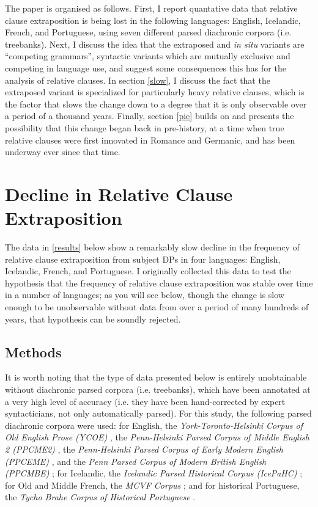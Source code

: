 The paper is organised as follows.
First, I report quantative data that relative clause extraposition is being lost in the following languages: English, Icelandic, French, and Portuguese, using seven different parsed diachronic corpora (i.e. treebanks).
Next, I discuss the idea that the extraposed and \textsl{in situ} variants are ``competing grammars'', syntactic variants which are mutually exclusive and competing in language use, and suggest some consequences this has for the analysis of relative clauses.
In section \ref{slow}, I discuss the fact that the extraposed variant is specialized for particularly heavy relative clauses, which is the factor that slows the change down to a degree that it is only observable over a period of a thousand years.
Finally, section \ref{pie} builds on \citet{kiparsky1995} and presents the possibility that this change began back in pre-history, at a time when true relative clauses were first innovated in Romance and Germanic, and has been underway ever since that time.



\section{Decline in Relative Clause Extraposition}
\label{relclause}

The data in \ref{results} below show a remarkably slow decline in the frequency of relative clause extraposition from subject DPs in four languages: English, Icelandic, French, and Portuguese. I originally collected this data to test the hypothesis that the frequency of relative clause extraposition was stable over time in a number of languages; as you will see below, though the change is slow enough to be unobservable without data from over a period of many hundreds of years, that hypothesis can be soundly rejected.

\subsection{Methods}

It is worth noting that the type of data presented below is entirely unobtainable without diachronic parsed corpora (i.e. treebanks), which have been annotated at a very high level of accuracy (i.e. they have been hand-corrected by expert syntacticians, not only automatically parsed). For this study, the following parsed diachronic corpora were used: for English, the \textsl{York-Toronto-Helsinki Corpus of Old English Prose (YCOE)} \citep{ycoe}, the \textsl{Penn-Helsinki Parsed Corpus of Middle English 2 (PPCME2)} \citep{ppcme2}, the \textsl{Penn-Helsinki Parsed Corpus of Early Modern English (PPCEME)} \citep{ppceme}, and the \textsl{Penn Parsed Corpus of Modern British English (PPCMBE)} \citep{ppcmbe}; for Icelandic, the \textsl{Icelandic Parsed Historical Corpus (IcePaHC)} \citep{icepahc09}; for Old and Middle French, the \textsl{MCVF Corpus} \citep{mcvf}; and for historical Portuguese, the \textsl{Tycho Brahe Corpus of Historical Portuguese} \citep{tychobrahe}.

